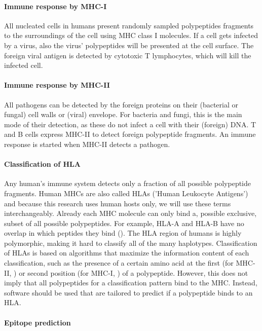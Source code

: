 \documentclass{article}
\begin{document}
\paragraph{Immune response by MHC-I}

All nucleated cells in humans present randomly sampled polypeptides
fragments to the surroundings of the cell using MHC class I molecules.
If a cell gets infected by a virus, also the virus' polypeptides
will be presented at the cell surface. The foreign viral antigen is detected 
by cytotoxic T lymphocytes, which will kill the infected cell.

\paragraph{Immune response by MHC-II}

All pathogens can be detected by the foreign proteins on 
their (bacterial or fungal) cell walls or (viral) envelope.
For bacteria and fungi, this is the main mode of their detection,
as these do not infect a cell with their (foreign) DNA.
T and B cells express MHC-II to detect foreign polypeptide fragments.
An immune response is started when MHC-II detects a pathogen.

\paragraph{Classification of HLA}

Any human's immune system detects only a fraction of all possible
polypeptide fragments. 
Human MHCs are also called HLAs ('Human Leukocyte Antigens') and
because this research uses human hosts only, we will use these terms
interchangeably.
Already each MHC molecule can only bind a, possible exclusive,
subset of all possible polypeptides.
For example, HLA-A and HLA-B have no overlap in which
peptides they bind (\cite{lund2004definition}).
The HLA region of humans is highly polymorphic, 
making it hard to classify all of the many haplotypes.
Classification of HLAs is based on algorithms that
maximize the information content of each 
classification, such as the presence of a certain amino acid at 
the first (for MHC-II, \cite{southwood1998several})
or second position (for MHC-I, \cite{lund2004definition}) of a polypeptide.
However, this does not imply that all polypeptides for a classification
pattern bind to the MHC. Instead, software should be used that are
tailored to predict if a polypeptide binds to an HLA.

\paragraph{Epitope prediction}
\end{document}
